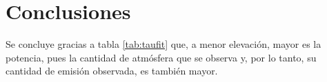 \section{Conclusiones}\label{sec:conclusiones}

Se concluye gracias a tabla \ref{tab:taufit} que, a menor elevación, mayor es la potencia, pues la cantidad de atmósfera que se observa y, por lo tanto, su cantidad de emisión observada, es también mayor. 